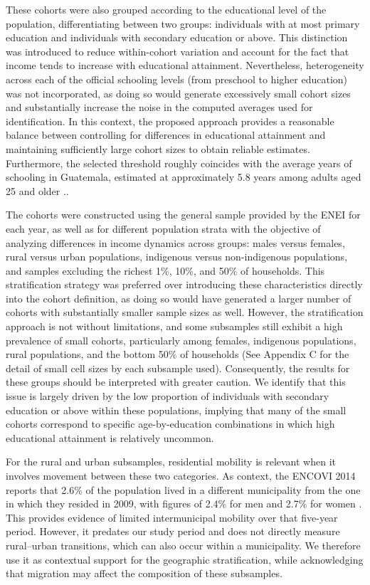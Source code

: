 \documentclass{article}
\begin{document}
These cohorts were also grouped according to the educational level of the population, differentiating between two groups: individuals with at most primary education and individuals with secondary education or above. This distinction was introduced to reduce within-cohort variation and account for the fact that income tends to increase with educational attainment. Nevertheless, heterogeneity across each of the official schooling levels (from preschool to higher education) was not incorporated, as doing so would generate excessively small cohort sizes and substantially increase the noise in the computed averages used for identification. In this context, the proposed approach provides a reasonable balance between controlling for differences in educational attainment and maintaining sufficiently large cohort sizes to obtain reliable estimates. Furthermore, the selected threshold roughly coincides with the average years of schooling in Guatemala, estimated at approximately 5.8 years among adults aged 25 and older \parencite{undp2025guatemala}..

The cohorts were constructed using the general sample provided by the ENEI for each year, as well as for different population strata with the objective of analyzing differences in income dynamics across groups: males versus females, rural versus urban populations, indigenous versus non-indigenous populations, and samples excluding the richest 1\%, 10\%, and 50\% of households. This stratification strategy was preferred over introducing these characteristics directly into the cohort definition, as doing so would have generated a larger number of cohorts with substantially smaller sample sizes as well. However, the stratification approach is not without limitations, and some subsamples still exhibit a high prevalence of small cohorts, particularly among females, indigenous populations, rural populations, and the bottom 50\% of households (See Appendix C for the detail of small cell sizes by each subsample used). Consequently, the results for these groups should be interpreted with greater caution. We identify that this issue is largely driven by the low proportion of individuals with secondary education or above within these populations, implying that many of the small cohorts correspond to specific age-by-education combinations in which high educational attainment is relatively uncommon.

For the rural and urban subsamples, residential mobility is relevant when it involves movement between these two categories. As context, the ENCOVI 2014 reports that 2.6\% of the population lived in a different municipality from the one in which they resided in 2009, with figures of 2.4\% for men and 2.7\% for women \parencite[section 2.8, p.~37]{ine2016encovi2014}. This provides evidence of limited intermunicipal mobility over that five-year period. However, it predates our study period and does not directly measure rural--urban transitions, which can also occur within a municipality. We therefore use it as contextual support for the geographic stratification, while acknowledging that migration may affect the composition of these subsamples.
\end{document}
